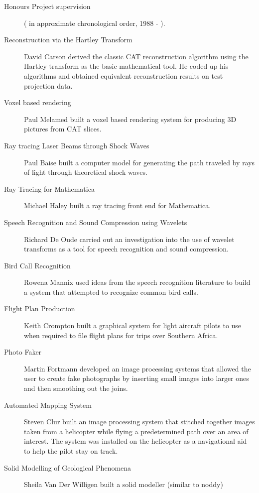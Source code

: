 
\begin{description}
\item[Honours Project supervision] ( in approximate chronological order, 1988 -  ).
\item[ Reconstruction via the Hartley Transform ]
      David Carson derived the classic CAT reconstruction algorithm
          using the Hartley transform as the basic mathematical tool. He coded up his
          algorithms and obtained equivalent reconstruction results on test projection data.
\item[ Voxel based rendering ]
      Paul Melamed built a voxel based rendering system for producing
          3D pictures from CAT slices.
\item[ Ray tracing Laser Beams through Shock Waves ]
      Paul Baise built a computer model for generating the path traveled
          by rays of light through theoretical shock waves.
\item[ Ray Tracing for Mathematica ]
      Michael Haley built a ray tracing front end for Mathematica.
\item[ Speech Recognition and Sound Compression using Wavelets ]
      Richard De Oude carried out an investigation into the use of
          wavelet transforms as a tool for speech recognition and
          sound compression.
\item[ Bird Call Recognition ]
      Rowena Mannix used ideas from the speech recognition literature
          to build a system that attempted to recognize common bird calls.
\item[ Flight Plan Production     ]  
      Keith Crompton built a graphical system for light aircraft pilots to
          use when required to file flight plans for trips over Southern Africa.
\item[ Photo Faker ]
      Martin Fortmann developed an image processing systems that
          allowed the user to create fake photographs by inserting small images
          into larger ones and then smoothing out the joins.
\item[ Automated Mapping System ]
      Steven Clur built an image processing system that stitched together
          images taken from a helicopter while flying a predetermined path
          over an area of interest. The system was installed on the
          helicopter as a navigational aid to help the pilot stay on track.
\item[ Solid Modelling of Geological Phenomena]
      Sheila Van Der Willigen built a solid modeller (similar to noddy)

\end{description}
